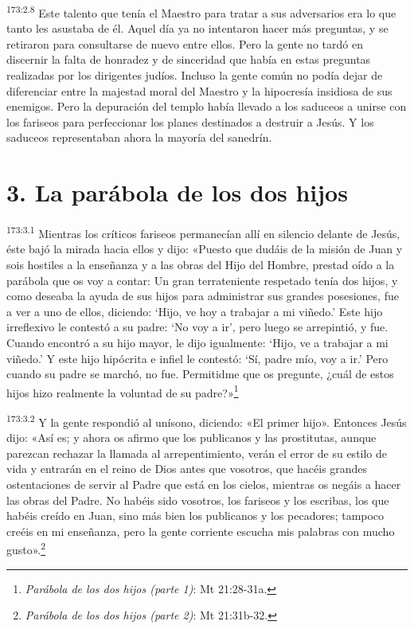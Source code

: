 \par 
\textsuperscript{173:2.8} Este talento que tenía el Maestro para tratar a sus adversarios era lo que tanto les asustaba de él. Aquel día ya no intentaron hacer más preguntas, y se retiraron para consultarse de nuevo entre ellos. Pero la gente no tardó en discernir la falta de honradez y de sinceridad que había en estas preguntas realizadas por los dirigentes judíos. Incluso la gente común no podía dejar de diferenciar entre la majestad moral del Maestro y la hipocresía insidiosa de sus enemigos. Pero la depuración del templo había llevado a los saduceos a unirse con los fariseos para perfeccionar los planes destinados a destruir a Jesús. Y los saduceos representaban ahora la mayoría del sanedrín.

\section*{3. La parábola de los dos hijos}
\par 
\textsuperscript{173:3.1} Mientras los críticos fariseos permanecían allí en silencio delante de Jesús, éste bajó la mirada hacia ellos y dijo: «Puesto que dudáis de la misión de Juan y sois hostiles a la enseñanza y a las obras del Hijo del Hombre, prestad oído a la parábola que os voy a contar: Un gran terrateniente respetado tenía dos hijos, y como deseaba la ayuda de sus hijos para administrar sus grandes posesiones, fue a ver a uno de ellos, diciendo: `Hijo, ve hoy a trabajar a mi viñedo.' Este hijo irreflexivo le contestó a su padre: `No voy a ir', pero luego se arrepintió, y fue. Cuando encontró a su hijo mayor, le dijo igualmente: `Hijo, ve a trabajar a mi viñedo.' Y este hijo hipócrita e infiel le contestó: `Sí, padre mío, voy a ir.' Pero cuando su padre se marchó, no fue. Permitidme que os pregunte, ¿cuál de estos hijos hizo realmente la voluntad de su padre?»\footnote{\textit{Parábola de los dos hijos (parte 1)}: Mt 21:28-31a.}

\par 
\textsuperscript{173:3.2} Y la gente respondió al unísono, diciendo: «El primer hijo». Entonces Jesús dijo: «Así es; y ahora os afirmo que los publicanos y las prostitutas, aunque parezcan rechazar la llamada al arrepentimiento, verán el error de su estilo de vida y entrarán en el reino de Dios antes que vosotros, que hacéis grandes ostentaciones de servir al Padre que está en los cielos, mientras os negáis a hacer las obras del Padre. No habéis sido vosotros, los fariseos y los escribas, los que habéis creído en Juan, sino más bien los publicanos y los pecadores; tampoco creéis en mi enseñanza, pero la gente corriente escucha mis palabras con mucho gusto».\footnote{\textit{Parábola de los dos hijos (parte 2)}: Mt 21:31b-32.}

